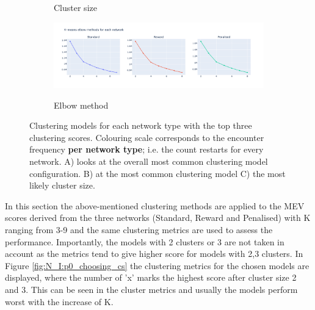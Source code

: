 \begin{figure}[H]
\begin{subfigure}[b]{0.49\textwidth}
        \caption{Cluster size}
    \end{subfigure}
     \hfill
    \begin{subfigure}[b]{0.49\textwidth}
        \centering
        \includegraphics[width=\textwidth, keepaspectratio]{Sections/Network_I/Resources/P0/p0_elbowMethod_4K.png}
        \label{fig:N_I:p0_elbow_method}
        \caption{Elbow method}
    \end{subfigure}
    \caption{Clustering models for each network type with the top three clustering scores. Colouring scale corresponds to the encounter frequency \textbf{per network type}; i.e. the count restarts for every network. A) looks at the overall most common clustering model configuration. B) at the most common clustering model C) the most likely cluster size.}
    \label{fig:N_I:p0_top_3_metrics}
\end{figure}

In this section the above-mentioned clustering methods are applied to the MEV scores derived from the three networks (Standard, Reward and Penalised) with K ranging from 3-9 and the same clustering metrics are used to assess the performance. Importantly, the models with 2 clusters or 3 are not taken in account as the metrics tend to give higher score for models with 2,3 clusters. In Figure \ref{fig:N_I:p0_choosing_cs} the clustering metrics for the chosen models are displayed, where the number of 'x' marks the highest score after cluster size 2 and 3. This can be seen in the cluster metrics and usually the models perform worst with the increase of K. 

